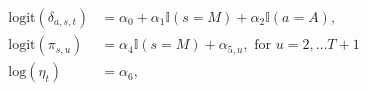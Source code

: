 \begin{equation}
  \begin{aligned}
    \text{logit}(\delta_{a, s, t}) &= \alpha_{0} + \alpha_{1}\mathbb{I}(s = M) + \alpha_{2}\mathbb{I}(a = A), \\
    \text{logit}(\pi_{s, u}) &= \alpha_{4} \mathbb{I}(s = M) + \alpha_{5, u}, \,\, \text{for} \,\, u = 2, \ldots T + 1 \\
    \text{log}(\eta_{t}) &= \alpha_{6},
  \end{aligned}
  \label{eqn:parameterisation-info}
\end{equation}